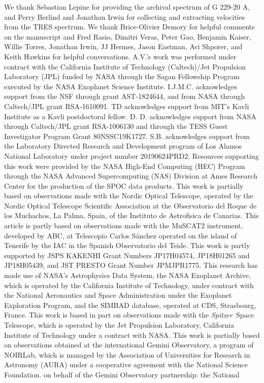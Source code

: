 \documentclass{nature3}
\newcommand{\project}[1]{\textsl{#1}}
\newcommand{\Spitzer}{\project{Spitzer}}
\begin{document}
%                                    
%  





\begin{addendum}
\item  We thank Sebastian Lepine for providing the archival spectrum of G 229-20 A, and Perry Berlind and Jonathan Irwin for collecting and extracting velocities from the TRES spectrum. We thank Brice-Olivier Demory for helpful comments on the manuscript and Fred Rasio, Dimitri Veras, Peter Gao, Benjamin Kaiser, Willie Torres, Jonathan Irwin, JJ Hermes, Jason Eastman, Avi Shporer, and Keith Hawkins for helpful conversations. A.V.'s work was performed under contract with the California Institute of Technology (Caltech)/Jet Propulsion Laboratory (JPL) funded by NASA through the Sagan Fellowship Program executed by the NASA Exoplanet Science Institute.  I.J.M.C. acknowledges support from the NSF through grant AST-1824644, and from NASA through Caltech/JPL grant RSA-1610091. TD acknowledges support from MIT’s Kavli Institute as a Kavli postdoctoral fellow. D. D. acknowledges support from NASA through Caltech/JPL grant RSA-1006130 and through the TESS Guest Investigator Program Grant 80NSSC19K1727. S.B. acknowledges support from the Laboratory Directed Research and Development program of Los Alamos National Laboratory under project number 20190624PRD2. Resources supporting this work were provided by the NASA High-End Computing (HEC) Program through the NASA Advanced Supercomputing (NAS) Division at Ames Research Center for the production of the SPOC data products. This work is partially based on observations made with the Nordic Optical Telescope, operated by the Nordic Optical Telescope Scientific Association at the Observatorio del Roque de los Muchachos, La Palma, Spain, of the Instituto de Astrofisica de Canarias. This article is partly based on observations made with the MuSCAT2 instrument, developed by ABC, at Telescopio Carlos S\'anchez operated on the island of Tenerife by the IAC in the Spanish Observatorio del Teide. This work is partly supported by JSPS KAKENHI Grant Numbers JP17H04574, JP18H01265 and JP18H05439, and JST PRESTO Grant Number JPMJPR1775. This research has made use of NASA's Astrophysics Data System, the NASA Exoplanet Archive, which is operated by the California Institute of Technology, under contract with the National Aeronautics and Space Administration under the Exoplanet Exploration Program, and the SIMBAD database, operated at CDS, Strasbourg, France. This work is based in part on observations made with the \Spitzer\ Space Telescope, which is operated by the Jet Propulsion Laboratory, California Institute of Technology under a contract with NASA. This work is partially based on observations obtained at the international Gemini Observatory, a program of NOIRLab, which is managed by the Association of Universities for Research in Astronomy (AURA) under a cooperative agreement with the National Science Foundation. on behalf of the Gemini Observatory partnership: the National 
\end{addendum}
\end{document}
